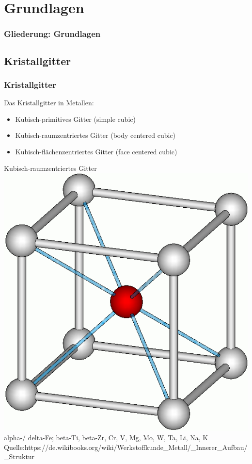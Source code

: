\section{Grundlagen}

\begin{frame}[t]\frametitle{Gliederung: Grundlagen}
\tableofcontents[
currentsection,
subsectionstyle=show/show/hide
]
\end{frame}

\subsection{Kristallgitter}
\label{grnd:gitter}
\begin{frame}[c]\frametitle{Kristallgitter}
	Das Kristallgitter in Metallen:
	\begin{itemize}
		\item{Kubisch-primitives Gitter (simple cubic)}
		\item{Kubisch-raumzentriertes Gitter (body centered cubic)}
		\item{Kubisch-flächenzentriertes Gitter (face centered cubic)}
	\end{itemize}
\end{frame}

\begin{frame}[c]
	\centering
	Kubisch-raumzentriertes Gitter
	\\
	\includegraphics[height=0.4\textwidth]{medien/Krz.png}
	\\
	\tiny{ alpha-/ delta-Fe; beta-Ti, beta-Zr, Cr, V, Mg, Mo, W, Ta, Li, Na, K}
	\\
	\tiny{Quelle:https://de.wikibooks.org/wiki/Werkstoffkunde\_Metall/\_Innerer\_Aufbau/\_Struktur}
\end{frame}

